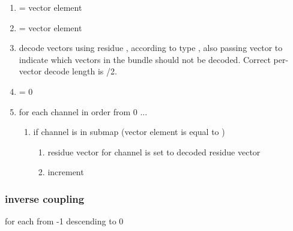 \begin{enumerate}
\begin{enumerate}
  \end{enumerate}
 \item {} = vector  element \varname{[i]}
 \item {} = vector  element 
 \item decode \varname{[ch]} vectors using residue , according to type , also passing vector  to indicate which vectors in the bundle should not be decoded. Correct per-vector decode length is \varname{[n]}/2.
 \item \varname{[ch]} = 0
 \item for each channel \varname{[j]} in order from 0 ... 
  \begin{enumerate}
   \item if channel \varname{[j]} is in submap \varname{[i]} (vector  element \varname{[j]} is equal to \varname{[i]})
    \begin{enumerate}
     \item residue vector for channel \varname{[j]} is set to decoded residue vector \varname{[ch]}
     \item increment \varname{[ch]}
    \end{enumerate}

  \end{enumerate}

\end{enumerate}



\subsubsection{inverse coupling}

for each \varname{[i]} from -1 descending to 0

